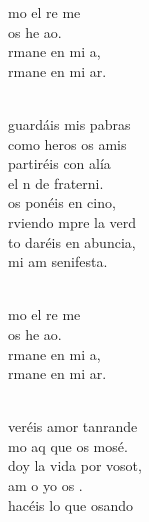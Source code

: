 \begin{cancion}[Amaos][Kairoi]%
	\begin{chorus}%
	mo el re me  \\
	 os he ao.\\
	rmane en mi a,\\
	rmane en mi ar.\\
	\end{chorus}%
	\jump\\
	guardáis mis pabras\\
	como heros os amis\\
	partiréis con alía\\
	el n de fraterni.\\
	os ponéis en cino,\\
	rviendo mpre la verd\\
	to daréis en abuncia,\\
	mi am senifesta.\\\jump\\
	\begin{chorus}%
	mo el re me  \\
	 os he ao.\\
	rmane en mi a,\\
	rmane en mi ar.\\
	\end{chorus}%
	\jump\\
	veréis amor tanrande\\
	mo aq que os mosé.\\
	doy la vida por vosot,\\
	am o yo os . \\
	hacéis lo que osando\\

\end{cancion}
